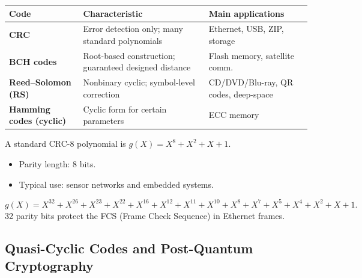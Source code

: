 \begin{center}
\renewcommand{\arraystretch}{1.2}
\begin{tabular}{@{}p{3.5cm}p{5cm}p{5cm}@{}}
	\toprule
	\textbf{Code} & \textbf{Characteristic} & \textbf{Main applications} \\
	\midrule
	\textbf{CRC} & Error detection only; many standard polynomials & Ethernet, USB, ZIP, storage \\
	\textbf{BCH codes} & Root-based construction; guaranteed designed distance & Flash memory, satellite comm. \\
	\textbf{Reed--Solomon (RS)} & Nonbinary cyclic; symbol-level correction & CD/DVD/Blu-ray, QR codes, deep-space \\
	\textbf{Hamming codes (cyclic)} & Cyclic form for certain parameters & ECC memory \\
	\bottomrule
\end{tabular}
\end{center}

\begin{example}
A standard CRC-8 polynomial is \(g(X)=X^8+X^2+X+1\).
\begin{itemize}
	\item Parity length: 8 bits.
	\item Typical use: sensor networks and embedded systems.
\end{itemize}
\end{example}

\begin{example}
\[g(X)=X^{32}+X^{26}+X^{23}+X^{22}+X^{16}+X^{12}+X^{11}+X^{10}+X^8+X^7+X^5+X^4+X^2+X+1.\]
32 parity bits protect the FCS (Frame Check Sequence) in Ethernet frames.
\end{example}

\newpage
\subsection{Quasi-Cyclic Codes and Post-Quantum Cryptography}


